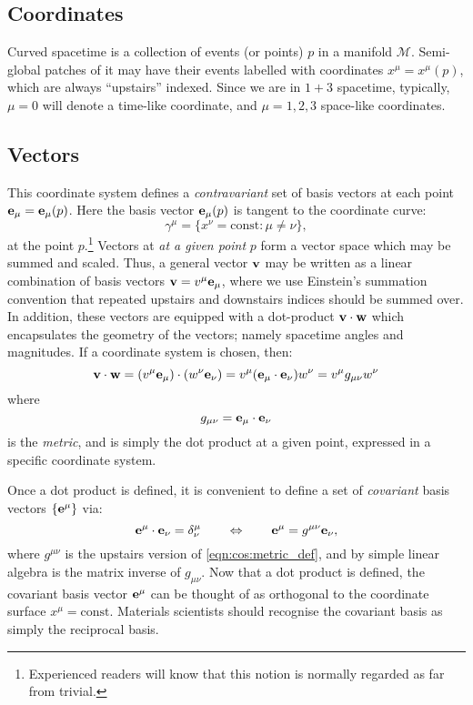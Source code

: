 \subsection{Coordinates}
Curved spacetime is a collection of events (or points) $p$ in a manifold $\mathcal{M}$. Semi-global patches of it may have their events labelled with coordinates $x^\mu = x^\mu(p)$, which are always ``upstairs'' indexed. Since we are in $1+3$ spacetime, typically, $\mu=0$ will denote a time-like coordinate, and $\mu=1,2,3$ space-like coordinates.

\subsection{Vectors}
This coordinate system defines a {\em contravariant\/} set of basis vectors at each point $\mathbf{e}_\mu = \mathbf{e}_\mu(p)$. Here the basis vector $\mathbf{e}_\mu(p)$ is tangent to the coordinate curve:
\begin{equation}
  \gamma^\mu = \{x^\nu=\mathrm{const} : \mu\ne\nu\},
  \label{eqn:cos:coordinate_curve}
\end{equation}
at the point $p$.\footnote{Experienced readers will know that this notion is normally regarded as far from trivial.}
  Vectors at {\em at a given point\/} $p$ form a vector space which may be summed and scaled. Thus, a general vector $\mathbf{v}$ may be written as a linear combination of basis vectors $\mathbf{v} = v^\mu \mathbf{e}_\mu$, where we use Einstein's summation convention that repeated upstairs and downstairs indices should be summed over. In addition, these vectors are equipped with a dot-product $\mathbf{v}\cdot\mathbf{w}$ which encapsulates the geometry of the vectors; namely spacetime angles and magnitudes. If a coordinate system is chosen, then:
\begin{equation}
  \mathbf{v}\cdot\mathbf{w} = (v^\mu\mathbf{e}_\mu)\cdot(w^\nu\mathbf{e}_\nu) = v^\mu (\mathbf{e}_\mu\cdot\mathbf{e}_\nu)w^\nu =  v^\mu g_{\mu\nu} w^\nu
  \label{eqn:cos:dot_product}
\end{equation}
where 
\begin{equation}
  g_{\mu\nu} = \mathbf{e}_\mu\cdot\mathbf{e}_\nu
  \label{eqn:cos:metric_def}
\end{equation}
is the {\em metric}, and is simply the dot product at a given point, expressed in a specific coordinate system.

Once a dot product is defined, it is convenient to define a set of {\em covariant\/} basis vectors $\{\mathbf{e}^\mu\}$ via:
\begin{equation}
  \mathbf{e}^\mu \cdot \mathbf{e}_\nu = \delta^\mu_\nu 
  \qquad\Leftrightarrow\qquad
  \mathbf{e}^\mu = g^{\mu\nu} \mathbf{e}_\nu,
  \label{eqn:cos:covariant_basis}
\end{equation}
where $g^{\mu\nu}$ is the upstairs version of \eqref{eqn:cos:metric_def}, and by simple linear algebra is the matrix inverse of $g_{\mu\nu}$. Now that a dot product is defined, the covariant basis vector $\mathbf{e}^\mu$ can be thought of as orthogonal to the coordinate surface $x^\mu=\mathrm{const}$. Materials scientists should recognise the covariant basis as simply the reciprocal basis. 

